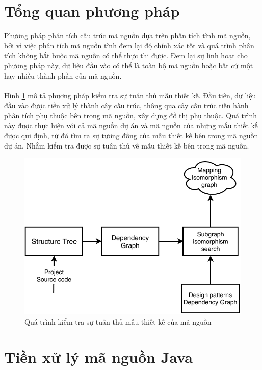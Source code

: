 \documentclass[12pt]{report}
\begin{document}
\section{Tổng quan phương pháp}
Phương pháp phân tích cấu trúc mã nguồn dựa trên phấn tích tĩnh mã nguồn, bởi vì việc phân tích mã nguồn tĩnh đem lại độ chính xác tốt và quá trình phân tích không bắt buộc mã nguồn có thể thực thi được. Đem lại sự linh hoạt cho phương pháp này, dữ liệu đầu vào có thể là toàn bộ mã nguồn hoặc bất cứ một hay nhiều thành phần của mã nguồn.\\\\
Hình \ref{fig:general_architecture} mô tả phương pháp kiểm tra sự tuân thủ mẫu thiết kế. Đầu tiên, dữ liệu đầu vào được tiền xử lý thành cây cấu trúc, thông qua cây cấu trúc tiến hành phân tích phụ thuộc bên trong mã nguồn, xây dựng đồ thị phụ thuộc. Quá trình này được thực hiện với cả mã nguồn dự án và mã nguồn của những mấu thiết kế được qui định, từ đó tìm ra sự tương đồng của mẫu thiết kế bên trong mã nguồn dự án. Nhằm kiểm tra được sự tuân thủ về mẫu thiết kế bên trong mã nguồn.
\begin{figure}[h]
	\centering
	\includegraphics[scale=0.36]{images/general_architecture_3_1}
	\caption{Quá trình kiểm tra sự tuân thủ mẫu thiết kế của mã nguồn}
	\label{fig:general_architecture}
\end{figure}
\section{Tiền xử lý mã nguồn Java}
\end{document}
